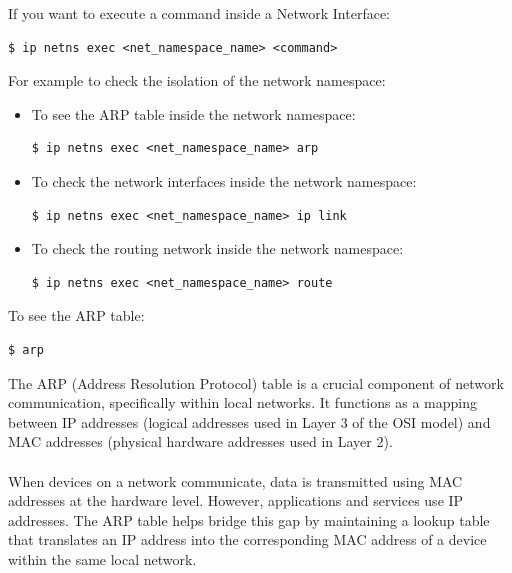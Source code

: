\documentclass{article}
\newenvironment{blocktemplateII}[1]{%
    \tcolorbox[beamer,%
    noparskip,breakable,
    colframe=Green,%
    colbacklower=LimeGreen!75!LightGreen,%
    title=#1]}%
    {\endtcolorbox}
\newenvironment{codetemplate}[1][]{%
  \mybasecolorbox[#1]
  \itshape
}{%
  \endmybasecolorbox
}
\begin{document}
If you want to execute a command inside a Network Interface:
\begin{codetemplate}{}
\begin{verbatim}
$ ip netns exec <net_namespace_name> <command>
\end{verbatim}
\end{codetemplate}

For example to check the isolation of the network namespace:
\begin{itemize}
    \item To see the ARP table inside the network namespace:
\begin{codetemplate}{}
\begin{verbatim}
$ ip netns exec <net_namespace_name> arp
\end{verbatim}
\end{codetemplate}
    \item To check the network interfaces inside the network namespace:
\begin{codetemplate}{}
\begin{verbatim}
$ ip netns exec <net_namespace_name> ip link
\end{verbatim}
\end{codetemplate}
    \item To check the routing network inside the network namespace:
\begin{codetemplate}{}
\begin{verbatim}
$ ip netns exec <net_namespace_name> route
\end{verbatim}
\end{codetemplate}
\end{itemize}

To see the ARP table:
\begin{codetemplate}{}
\begin{verbatim}
$ arp
\end{verbatim}
\end{codetemplate}

\begin{blocktemplateII}{NOTE}
The ARP (Address Resolution Protocol) table is a crucial component of network communication, specifically within local networks. It functions as a mapping between IP addresses (logical addresses used in Layer 3 of the OSI model) and MAC addresses (physical hardware addresses used in Layer 2).
\\\\
When devices on a network communicate, data is transmitted using MAC addresses at the hardware level. However, applications and services use IP addresses. The ARP table helps bridge this gap by maintaining a lookup table that translates an IP address into the corresponding MAC address of a device within the same local network.
\end{blocktemplateII}
\end{document}
